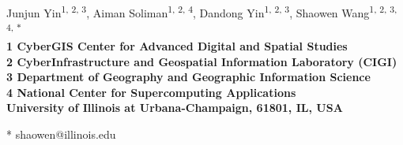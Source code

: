 \documentclass[10pt,letterpaper]{article}
\date{}
\begin{document}
\vspace*{0.35in}

\begin{flushleft}
{\Large
\textbf{}
}
\newline
\\
Junjun Yin\textsuperscript{1, 2, 3},
Aiman Soliman\textsuperscript{1, 2, 4},
Dandong Yin\textsuperscript{1, 2, 3},
Shaowen Wang\textsuperscript{1, 2, 3, 4, $\ast$}
\\
\bigskip
\bf{1} CyberGIS Center for Advanced Digital and Spatial Studies
\\
\bf{2} CyberInfrastructure and Geospatial Information Laboratory (CIGI)
\\
\bf{3} Department of Geography and Geographic Information Science
\\
\bf{4} National Center for Supercomputing Applications
\\
\bf{} University of Illinois at Urbana-Champaign, 61801, IL, USA
\\
\bigskip

% 
%




* shaowen@illinois.edu

\end{flushleft}
\end{document}

